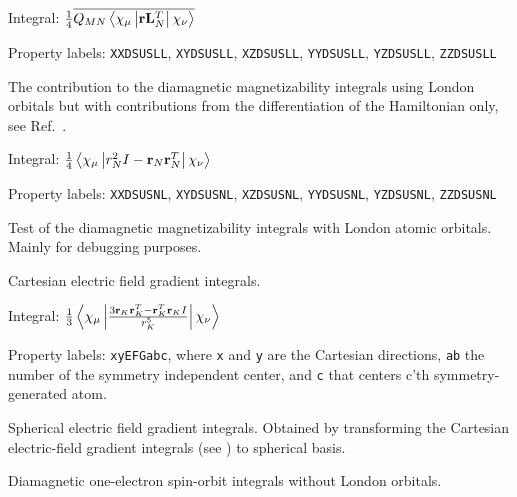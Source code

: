 \begin{description}
\begin{list}{}{}
\item Integral: $\frac{1}{4}\overline{Q_{MN}\left<\chi_{\mu}\left|{\bf
r}{\bf L}_{N}^{T}\right|\chi_{\nu}\right>}$
\item Property labels: \verb|XXDSUSLL|, \verb|XYDSUSLL|,
\verb|XZDSUSLL|, \verb|YYDSUSLL|, \verb|YZDSUSLL|, \verb|ZZDSUSLL|
\end{list}

\item[\Key{DSUSNL}] The contribution to the diamagnetic
magnetizability integrals using
London orbitals but with
contributions from the differentiation of the Hamiltonian only, see
Ref.~\cite{thpjjcp95}.

\begin{list}{}{}
\item Integral: $\frac{1}{4}\left<\chi_{\mu}\left|r^{2}_{N}I - {\bf r}_{N}
{\bf r}_{N}^{T}\right|\chi_{\nu}\right>$
\item Property labels: \verb|XXDSUSNL|, \verb|XYDSUSNL|,
\verb|XZDSUSNL|, \verb|YYDSUSNL|, \verb|YZDSUSNL|, \verb|ZZDSUSNL|
\end{list}

\item[\Key{DSUTST}] Test of the diamagnetic magnetizability
integrals with London atomic
orbitals. Mainly for debugging purposes.

\item[\Key{EFGCAR}] Cartesian electric field gradient
integrals.

\begin{list}{}{}
\item Integral: $\frac{1}{3}\left<\chi_{\mu}\left|\frac{3{\bf
r}_K{\bf r}_K^T - {\bf r}_K^T{\bf r}_KI}{r_K^5}\right|\chi_{\nu}\right>$
\item Property labels: \verb|xyEFGabc|, where \verb|x| and \verb|y| are
the Cartesian directions, \verb|ab| the number of the symmetry
independent center, and \verb|c| that centers c'th symmetry-generated
atom.
\end{list}

\item[\Key{EFGSPH}] Spherical electric field gradient
 integrals. Obtained by transforming
the Cartesian electric-field gradient integrals (see ) to
spherical basis.

\item[\Key{ELGDIA}] Diamagnetic one-electron spin-orbit integrals
without London orbitals.


\end{description}
